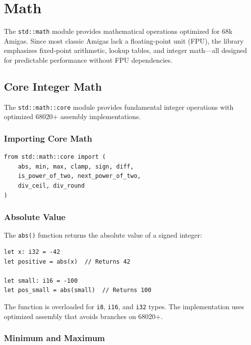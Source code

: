 \chapter{Math}
\label{chap:math}

The \texttt{std::math} module provides mathematical operations optimized for 68k Amigas. Since most classic Amigas lack a floating-point unit (FPU), the library emphasizes fixed-point arithmetic, lookup tables, and integer math---all designed for predictable performance without FPU dependencies.

\section{Core Integer Math}
\label{sec:math-core}

The \texttt{std::math::core} module provides fundamental integer operations with optimized 68020+ assembly implementations.

\subsection{Importing Core Math}

\begin{lstlisting}
from std::math::core import (
    abs, min, max, clamp, sign, diff,
    is_power_of_two, next_power_of_two,
    div_ceil, div_round
)
\end{lstlisting}

\subsection{Absolute Value}

The \texttt{abs()} function returns the absolute value of a signed integer:

\begin{lstlisting}
let x: i32 = -42
let positive = abs(x)  // Returns 42

let small: i16 = -100
let pos_small = abs(small)  // Returns 100
\end{lstlisting}

The function is overloaded for \texttt{i8}, \texttt{i16}, and \texttt{i32} types. The implementation uses optimized assembly that avoids branches on 68020+.

\subsection{Minimum and Maximum}


